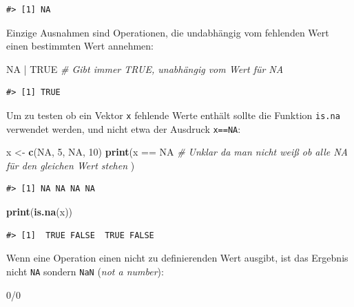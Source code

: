 \documentclass[]{tufte-book}
\newenvironment{Shaded}{}{}
\newcommand{\KeywordTok}[1]{\textcolor[rgb]{0.00,0.44,0.13}{\textbf{#1}}}
\newcommand{\DecValTok}[1]{\textcolor[rgb]{0.25,0.63,0.44}{#1}}
\newcommand{\StringTok}[1]{\textcolor[rgb]{0.25,0.44,0.63}{#1}}
\newcommand{\CommentTok}[1]{\textcolor[rgb]{0.38,0.63,0.69}{\textit{#1}}}
\newcommand{\OtherTok}[1]{\textcolor[rgb]{0.00,0.44,0.13}{#1}}
\newcommand{\OperatorTok}[1]{\textcolor[rgb]{0.40,0.40,0.40}{#1}}
\newcommand{\NormalTok}[1]{#1}
\begin{document}
\begin{verbatim}
#> [1] NA
\end{verbatim}

Einzige Ausnahmen sind Operationen, die undabhängig vom fehlenden Wert
einen bestimmten Wert annehmen:

\begin{Shaded}
\begin{Highlighting}[]
\OtherTok{NA} \OperatorTok{|}\StringTok{ }\OtherTok{TRUE}  \CommentTok{# Gibt immer TRUE, unabhängig vom Wert für NA}
\end{Highlighting}
\end{Shaded}

\begin{verbatim}
#> [1] TRUE
\end{verbatim}

Um zu testen ob ein Vektor \texttt{x} fehlende Werte enthält sollte die
Funktion \texttt{is.na} verwendet werden, und nicht etwa der Ausdruck
\texttt{x==NA}:

\begin{Shaded}
\begin{Highlighting}[]
\NormalTok{x <-}\StringTok{ }\KeywordTok{c}\NormalTok{(}\OtherTok{NA}\NormalTok{, }\DecValTok{5}\NormalTok{, }\OtherTok{NA}\NormalTok{, }\DecValTok{10}\NormalTok{)}
\KeywordTok{print}\NormalTok{(x }\OperatorTok{==}\StringTok{ }\OtherTok{NA}  \CommentTok{# Unklar da man nicht weiß ob alle NA für den gleichen Wert stehen}
\NormalTok{)}
\end{Highlighting}
\end{Shaded}

\begin{verbatim}
#> [1] NA NA NA NA
\end{verbatim}

\begin{Shaded}
\begin{Highlighting}[]
\KeywordTok{print}\NormalTok{(}\KeywordTok{is.na}\NormalTok{(x))}
\end{Highlighting}
\end{Shaded}

\begin{verbatim}
#> [1]  TRUE FALSE  TRUE FALSE
\end{verbatim}

Wenn eine Operation einen nicht zu definierenden Wert ausgibt, ist das
Ergebnis nicht \texttt{NA} sondern \texttt{NaN} (\emph{not a number}):

\begin{Shaded}
\begin{Highlighting}[]
\DecValTok{0}\OperatorTok{/}\DecValTok{0}
\end{Highlighting}
\end{Shaded}
\end{document}
